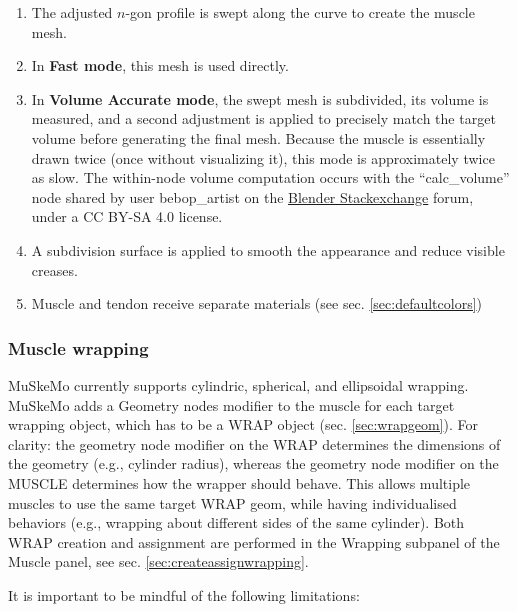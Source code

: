\documentclass{article}
\begin{document}
\begin{enumerate}
    \item The adjusted $n$-gon profile is swept along the curve to create the muscle mesh.
    \item In \textbf{Fast mode}, this mesh is used directly.
    \item In \textbf{Volume Accurate mode}, the swept mesh is subdivided, its volume is measured, and a second adjustment is applied to precisely match the target volume before generating the final mesh. Because the muscle is essentially drawn twice (once without visualizing it), this mode is approximately twice as slow. The within-node volume computation occurs with the ``calc\_volume'' node shared by user bebop\_artist on the \href{https://blender.stackexchange.com/a/325516}{Blender Stackexchange} forum, under a CC BY-SA 4.0 license.
    \item A subdivision surface is applied to smooth the appearance and reduce visible creases.
    \item Muscle and tendon receive separate materials (see sec. \ref{sec:defaultcolors})
\end{enumerate}

\subsubsection{Muscle wrapping}
\label{sec:musclewrapping}
MuSkeMo currently supports cylindric, spherical, and ellipsoidal wrapping. MuSkeMo adds a Geometry nodes modifier to the muscle for each target wrapping object, which has to be a WRAP object (sec. \ref{sec:wrapgeom}). For clarity: the geometry node modifier on the WRAP determines the dimensions of the geometry (e.g., cylinder radius), whereas the geometry node modifier on the MUSCLE determines how the wrapper should behave. This allows multiple muscles to use the same target WRAP geom, while having individualised behaviors (e.g., wrapping about different sides of the same cylinder). Both WRAP creation and assignment are performed in the Wrapping subpanel of the Muscle panel, see sec. \ref{sec:createassignwrapping}.

It is important to be mindful of the following limitations:
\end{document}

